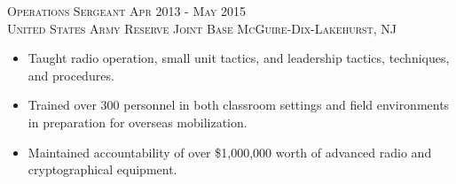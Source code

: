 \documentclass[letterpaper, 10pt]{article} %
\begin{document}

\textsc{Operations Sergeant \hfill Apr 2013 - May 2015} \\
\textsc{United States Army Reserve \hfill Joint Base McGuire-Dix-Lakehurst, NJ}
\begin{itemize}
 \item Taught radio operation, small unit tactics, and leadership tactics, techniques, and procedures.
 \item Trained over 300 personnel in both classroom settings and field environments in preparation for overseas mobilization.
 \item Maintained accountability of over \$1,000,000 worth of advanced radio and cryptographical equipment.
\end{itemize}




\hrulefill
\end{document}
